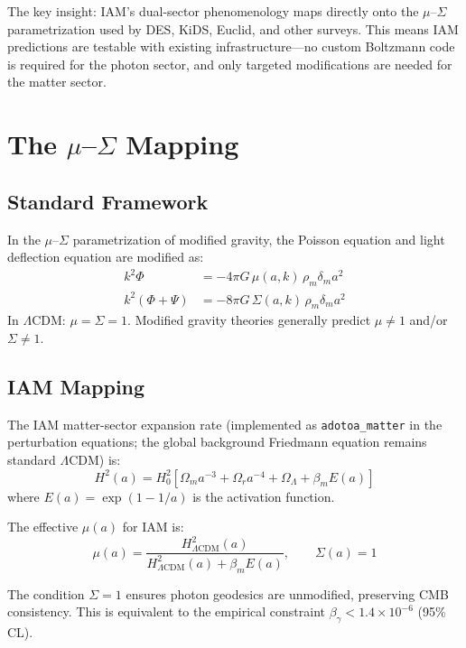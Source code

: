 \documentclass[11pt,letterpaper]{article}
\begin{document}
The key insight: IAM's dual-sector phenomenology maps directly onto the $\mu$--$\Sigma$ parametrization used by DES, KiDS, Euclid, and other surveys. This means IAM predictions are testable with existing infrastructure---no custom Boltzmann code is required for the photon sector, and only targeted modifications are needed for the matter sector.

\section{The $\mu$--$\Sigma$ Mapping}

\subsection{Standard Framework}

In the $\mu$--$\Sigma$ parametrization of modified gravity, the Poisson equation and light deflection equation are modified as:
\begin{align}
k^2 \Phi &= -4\pi G\, \mu(a,k)\, \rho_m \delta_m a^2 \label{eq:poisson}\\
k^2(\Phi + \Psi) &= -8\pi G\, \Sigma(a,k)\, \rho_m \delta_m a^2 \label{eq:deflection}
\end{align}
In $\Lambda$CDM: $\mu = \Sigma = 1$. Modified gravity theories generally predict $\mu \neq 1$ and/or $\Sigma \neq 1$.

\subsection{IAM Mapping}

The IAM matter-sector expansion rate (implemented as \texttt{adotoa\_matter} in the perturbation equations; the global background Friedmann equation remains standard $\Lambda$CDM) is:
\begin{equation}
H^2(a) = H_0^2\left[\Omega_m a^{-3} + \Omega_r a^{-4} + \Omega_\Lambda + \beta_m E(a)\right]
\end{equation}
where $E(a) = \exp(1 - 1/a)$ is the activation function.

The effective $\mu(a)$ for IAM is:
\begin{equation}
\boxed{\mu(a) = \frac{H^2_{\Lambda\text{CDM}}(a)}{H^2_{\Lambda\text{CDM}}(a) + \beta_m E(a)}, \qquad \Sigma(a) = 1}
\label{eq:mu_iam}
\end{equation}

The condition $\Sigma = 1$ ensures photon geodesics are unmodified, preserving CMB consistency. This is equivalent to the empirical constraint $\beta_\gamma < 1.4 \times 10^{-6}$ (95\% CL).
\end{document}
